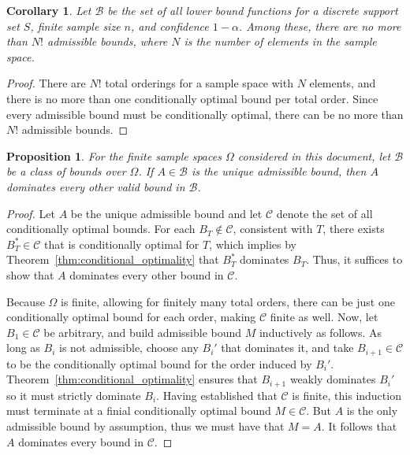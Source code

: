 \documentclass{article}
\newtheorem{proposition}[theorem]{Proposition}
\newtheorem{corollary}[theorem]{Corollary}
\theoremstyle{definition}
\theoremstyle{remark}
\newcounter{assumption}%
\begin{document}
\begin{corollary}
\label{cor:nfactorial}
Let $\mathcal{B}$ be the set of all lower bound functions for a discrete support set $S$, finite sample size $n$, and confidence $1-\alpha$.   Among these, there are no more than $N!$ admissible bounds, where $N$ is the number of elements in the sample space. 
\end{corollary}
\begin{proof}
There are $N!$ total orderings for a sample space with $N$ elements, and there is no more than one conditionally optimal bound per total order. Since every admissible bound must be conditionally optimal, there can be no more than $N!$ admissible bounds.
\end{proof}

\begin{proposition}
\label{prop:unique_implies_opt}
    For the finite sample spaces $\Omega$ considered in this document, let $\mathcal{B}$ be a class of bounds over $\Omega$. If $A \in \mathcal{B}$ is the unique admissible bound, then $A$ dominates every other valid bound in $\mathcal{B}$. 
\end{proposition}

\begin{proof}
    Let $A$ be the unique admissible bound and let $\mathcal{C}$ denote the set of all conditionally optimal bounds. For each $B_T \not \in \mathcal{C}$, consistent with $T$, there exists $B_T^* \in \mathcal{C}$ that is conditionally optimal for $T$, which implies by Theorem~\ref{thm:conditional_optimality} that $B_T^*$ dominates $B_T$. Thus, it suffices to show that $A$ dominates every other bound in $\mathcal{C}$.

    Because $\Omega$ is finite, allowing for finitely many total orders, there can be just one conditionally optimal bound for each order, making $\mathcal{C}$ finite as well. Now, let $B_1 \in \mathcal{C}$ be arbitrary, and build admissible bound $M$ inductively as follows. As long as $B_i$ is not admissible, choose any $B_i'$ that dominates it, and take $B_{i+1} \in 
    \mathcal{C}$ to be the conditionally optimal bound for the order induced by $B_i'$. Theorem~\ref{thm:conditional_optimality} ensures that $B_{i+1}$ weakly dominates $B_i'$ so it must strictly dominate $B_i$. Having established that $\mathcal{C}$ is finite, this induction must terminate at a finial conditionally optimal bound $M \in \mathcal{C}$. But $A$ is the only admissible bound by assumption, thus we must have that $M = A$. It follows that $A$ dominates every bound in $\mathcal{C}$.
\end{proof}
\color{black}
\end{document}
